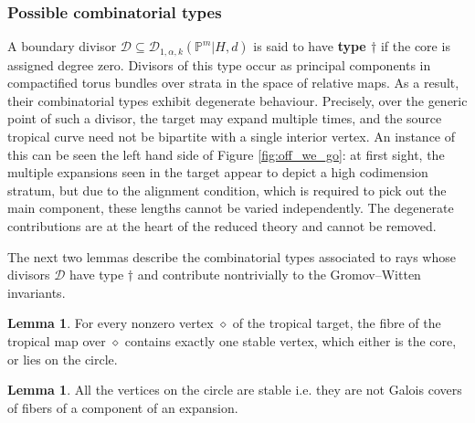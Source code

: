 \documentclass[11pt]{amsart}
\newcommand{\PP}{\mathbb P}
\newcommand{\Dcal}{\mathcal{D}}
\theoremstyle{definition}
\newtheorem{lemma}[thm]{Lemma}
\theoremstyle{definition}
\begin{document}
\subsubsection{Possible combinatorial types}\label{S:combinatorialdescription} A boundary divisor $\Dcal \subseteq \Dcal_{1,\alpha,k}(\PP^m|H,d)$ is said to have \textbf{type $\dag$} if the core is assigned degree zero. Divisors of this type occur as principal components in compactified torus bundles over strata in the space of relative maps. As a result, their combinatorial types exhibit degenerate behaviour. Precisely, over the generic point of such a divisor, the target may expand multiple times, and the source tropical curve need not be bipartite with a single interior vertex. An instance of this can be seen the left hand side of Figure \ref{fig:off_we_go}: at first sight, the multiple expansions seen in the target appear to depict a high codimension stratum, but due to the alignment condition, which is required to pick out the main component, these lengths cannot be varied independently. The degenerate contributions are at the heart of the reduced theory and cannot be removed.

The next two lemmas describe the combinatorial types associated to rays whose divisors $\Dcal$ have type $\dag$ and contribute nontrivially to the Gromov--Witten invariants.
\begin{lemma} \label{lemma type C0 combinatorial types}
 For every nonzero vertex $\diamond$ of the tropical target, the fibre of the tropical map over $\diamond$ contains exactly one stable vertex, which either is the core, or lies on the circle.
\end{lemma}

\begin{lemma}\label{lem:stable_vertices} All the vertices on the circle are stable i.e. they are not Galois covers of fibers of a component of an expansion.
\end{lemma}

\end{document}
